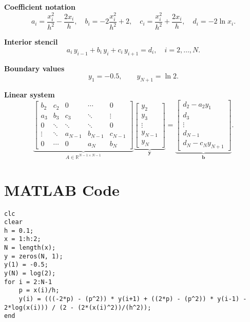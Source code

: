 \documentclass{article}
\begin{document}
\textbf{Coefficient notation}
\[
a_i=\frac{x_i^{2}}{h^{2}}-\frac{2x_i}{h},\quad
b_i=-2\frac{x_i^{2}}{h^{2}}+2,\quad
c_i=\frac{x_i^{2}}{h^{2}}+\frac{2x_i}{h},\quad
d_i=-2\ln x_i.
\]

\textbf{Interior stencil}
\[
a_i\,y_{i-1}+b_i\,y_i+c_i\,y_{i+1}=d_i,\quad i=2,\dots,N.
\]

\textbf{Boundary values}
\[
y_1=-0.5,\qquad y_{N+1}=\ln 2.
\]

\textbf{Linear system}
\[
\underbrace{
\begin{bmatrix}
b_{2} & c_{2} & 0 & \cdots & 0 \\
a_{3} & b_{3} & c_{3} & \ddots & \vdots \\
0 & \ddots & \ddots & \ddots & 0 \\
\vdots & \ddots & a_{N-1} & b_{N-1} & c_{N-1}\\
0 & \cdots & 0 & a_{N} & b_{N}
\end{bmatrix}}_{\displaystyle A\in\mathbb{R}^{N-1\times N-1}}
%
\underbrace{
\begin{bmatrix}
y_{2}\\ y_{3}\\ \vdots\\ y_{N-1}\\ y_{N}
\end{bmatrix}}_{\displaystyle \mathbf y}
=
\underbrace{
\begin{bmatrix}
d_{2}-a_{2}y_{1}\\
d_{3}\\
\vdots\\
d_{N-1}\\
d_{N}-c_{N}y_{N+1}
\end{bmatrix}}_{\displaystyle \mathbf b}.
\]

\section*{MATLAB Code}


\begin{tcolorbox}[title=MATLAB code to solve using Jordan method:]
\begin{lstlisting}
clc
clear
h = 0.1;
x = 1:h:2;
N = length(x);
y = zeros(N, 1);
y(1) = -0.5;
y(N) = log(2);
for i = 2:N-1
    p = x(i)/h;
    y(i) = (((-2*p) - (p^2)) * y(i+1) + ((2*p) - (p^2)) * y(i-1) - 2*log(x(i))) / (2 - (2*(x(i)^2))/(h^2));
end
\end{lstlisting}
\end{tcolorbox}
\end{document}
